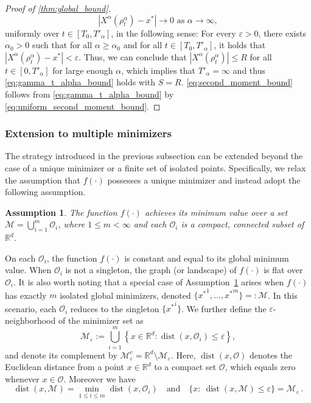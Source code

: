 \documentclass[reqno]{amsart}
\numberwithin{algorithm}{section}
\newcommand{\Xalpha}{{X^\alpha}}
\newcommand{\mc}[1]{\mathcal{#1}}
\newtheorem{assum}[theorem]{Assumption}
\begin{document}
{\begin{proof}[Proof of \cref{thm:global_bound}]
    \begin{equation}\label{eq:convergence_of_consensus}
            |\Xalpha(\rho^\alpha_t) - x^\ast| \to 0 \text{ as } \alpha \to \infty,
        \end{equation}
        uniformly over $t \in [T_0, T'_\alpha]$, in the following sense: For every $\varepsilon > 0$, there exists $\alpha_0 > 0$ such that for all $\alpha \geq \alpha_0$ and for all $t \in [T_0, T'_\alpha]$, it holds that $|\Xalpha(\rho^\alpha_t) - x^\ast| < \varepsilon$.
        Thus, we can conclude that $|\Xalpha(\rho^\alpha_t)| \leq R$ for all $t \in [0, T'_\alpha]$ for large enough $\alpha$, which implies that $T'_\alpha = \infty$ and thus \cref{eq:gamma_t_alpha_bound} holds with $S = R$. \cref{eq:second_moment_bound} follows from \cref{eq:gamma_t_alpha_bound} by \cref{eq:uniform_second_moment_bound}.
    \end{proof}

\subsubsection{Extension to multiple minimizers}
The strategy introduced in the previous subsection can be extended beyond the case of a unique minimizer or a finite set of isolated points. Specifically, we relax the assumption that $f(\cdot)$ possesses a unique minimizer and instead adopt the following assumption.

\begin{assum}\label{assum4}
The function $f(\cdot)$ achieves its minimum value over a set $\mathcal{M} = \bigcup_{i=1}^{m} \mathcal{O}_i$, where $1 \leq m < \infty$ and each $\mathcal{O}_i$ is a compact, connected subset of $\mathbb{R}^d$.
\end{assum}

On each $\mathcal{O}_i$, the function $f(\cdot)$ is constant and equal to its global minimum value. When $\mathcal{O}_i$ is not a singleton, the graph (or landscape) of $f(\cdot)$ is flat over $\mathcal{O}_i$. It is also worth noting that a special case of Assumption~\ref{assum4} arises when $f(\cdot)$ has exactly $m$ isolated global minimizers, denoted $\{{x^*}^1,\dots,{x^*}^m\} =: \mathcal{M}$. In this scenario, each $\mathcal{O}_i$ reduces to the singleton $\{{x^*}^i\}$.
We further define the $\varepsilon$-neighborhood of the minimizer set as
\begin{equation*}
    \mathcal{M}_\varepsilon := \bigcup_{i=1}^{m} \left\{ x \in \mathbb{R}^d : \operatorname{dist}(x, \mathcal{O}_i) \leq \varepsilon \right\},
\end{equation*}
and denote its complement by $\mathcal{M}_\varepsilon^c = \mathbb{R}^d \setminus \mathcal{M}_\varepsilon$.  
Here, $\operatorname{dist}(x, \mathcal{O})$ denotes the Euclidean distance from a point $x \in \mathbb{R}^d$ to a compact set $\mathcal{O}$, which equals zero whenever $x \in \mathcal{O}$. Moreover we have
\begin{equation}
   \operatorname{dist}(x,\mc{M})=\min_{1\leq i\leq m}\operatorname{dist}(x,\mc{O}_i)\quad \mbox{and}\quad \{x:~\operatorname{dist}(x,\mc{M})\leq \varepsilon\}=\mc{M}_\varepsilon\,.
\end{equation}

}
\end{document}
